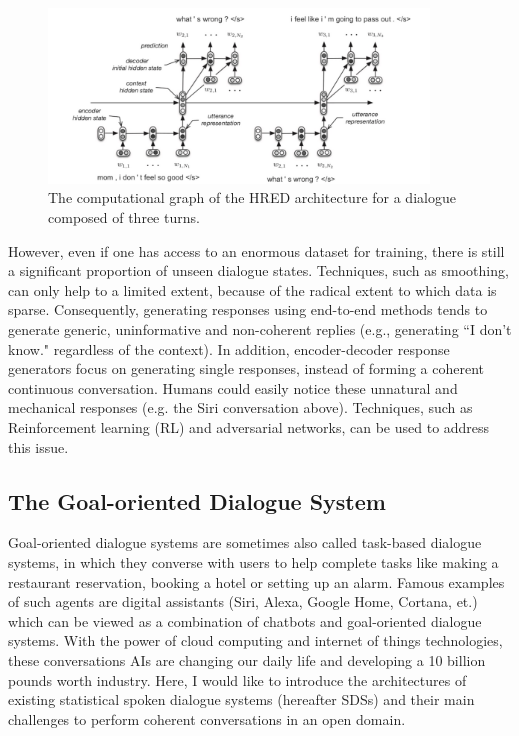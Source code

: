\documentclass[bsc,frontabs,twoside,singlespacing,parskip,deptreport]{infthesis}     %
\begin{document}
\begin{figure}[h]
    \centering
    \includegraphics[width=0.9\textwidth]{HERD.jpeg}
    \caption{The computational graph of the HRED architecture for a dialogue composed of three turns.}
    \label{fig:HERD}
\end{figure}

However, even if one has access to an enormous dataset for training, there is still a significant proportion of unseen dialogue states. Techniques, such as smoothing, can only help to a limited extent, because of the radical extent to which data is sparse. Consequently, generating responses using end-to-end methods tends to generate generic, uninformative and non-coherent replies (e.g., generating ``I don’t know." regardless of the context). In addition, encoder-decoder response generators focus on generating single responses, instead of forming a coherent continuous conversation\cite{jurafsky2019speech}. Humans could easily notice these unnatural and mechanical responses (e.g. the Siri conversation above). Techniques, such as Reinforcement learning (RL)\cite{li2016deep} and adversarial networks\cite{li2017adversarial}, can be used to address this issue.

\subsection{The Goal-oriented Dialogue System}

 Goal-oriented dialogue systems are sometimes also called task-based dialogue systems, in which they converse with users to help complete tasks like making a restaurant reservation, booking a hotel or setting up an alarm. Famous examples of such agents are digital assistants (Siri, Alexa, Google Home, Cortana, et.)\cite{siri,alexa,googlehome,cortana} which can be viewed as a combination of chatbots and goal-oriented dialogue systems. With the power of cloud computing and internet of things technologies, these conversations AIs are changing our daily life and developing a 10 billion pounds worth industry\cite{chatbotmarket}. Here, I would like to introduce the architectures of existing statistical spoken dialogue systems (hereafter SDSs) and their main challenges to perform coherent conversations in an open domain. 
\end{document}
